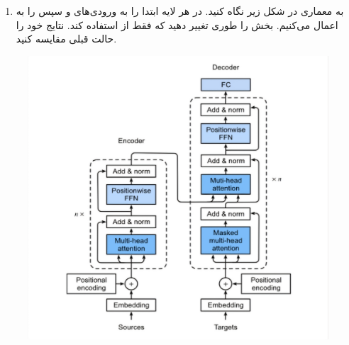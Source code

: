 \documentclass[12pt]{article}
\begin{document}
\begin{enumerate}
\begin{enumerate}
    \item به معماری  در شکل زیر نگاه کنید. در هر لایه ابتدا  را به ورودی‌های  و سپس  را به  اعمال می‌کنیم.  بخش  را طوری تغییر دهید که فقط از  استفاده کند. نتایج خود را حالت قبلی مقایسه کنید.
    \end{enumerate}
    \begin{figure}[h]  
            \centering
            \includegraphics[width=\textwidth]{figs/Q6.jpg}
            \label{fig:num_pic}  
        \end{figure}
    

\end{enumerate}
\end{document}
